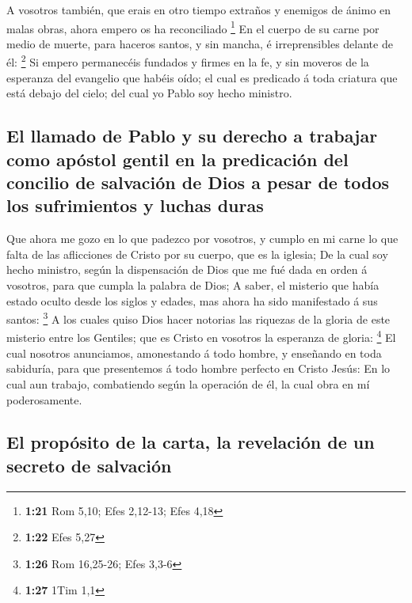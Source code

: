  A vosotros también, que erais en otro tiempo extraños y
enemigos de ánimo en malas obras, ahora empero os ha reconciliado
\footnote{\textbf{1:21} Rom 5,10; Efes 2,12-13; Efes 4,18}
 En el cuerpo de su carne por medio de muerte, para
haceros santos, y sin mancha, é irreprensibles delante de él:
\footnote{\textbf{1:22} Efes 5,27}  Si empero permanecéis
fundados y firmes en la fe, y sin moveros de la esperanza del evangelio
que habéis oído; el cual es predicado á toda criatura que está debajo
del cielo; del cual yo Pablo soy hecho ministro.

\hypertarget{el-llamado-de-pablo-y-su-derecho-a-trabajar-como-apuxf3stol-gentil-en-la-predicaciuxf3n-del-concilio-de-salvaciuxf3n-de-dios-a-pesar-de-todos-los-sufrimientos-y-luchas-duras}{%
\subsection{El llamado de Pablo y su derecho a trabajar como apóstol
gentil en la predicación del concilio de salvación de Dios a pesar de
todos los sufrimientos y luchas
duras}\label{el-llamado-de-pablo-y-su-derecho-a-trabajar-como-apuxf3stol-gentil-en-la-predicaciuxf3n-del-concilio-de-salvaciuxf3n-de-dios-a-pesar-de-todos-los-sufrimientos-y-luchas-duras}}

 Que ahora me gozo en lo que padezco por vosotros, y
cumplo en mi carne lo que falta de las aflicciones de Cristo por su
cuerpo, que es la iglesia;  De la cual soy hecho
ministro, según la dispensación de Dios que me fué dada en orden á
vosotros, para que cumpla la palabra de Dios;  A saber,
el misterio que había estado oculto desde los siglos y edades, mas ahora
ha sido manifestado á sus santos: \footnote{\textbf{1:26} Rom 16,25-26;
  Efes 3,3-6}  A los cuales quiso Dios hacer notorias las
riquezas de la gloria de este misterio entre los Gentiles; que es Cristo
en vosotros la esperanza de gloria: \footnote{\textbf{1:27} 1Tim 1,1}
 El cual nosotros anunciamos, amonestando á todo hombre,
y enseñando en toda sabiduría, para que presentemos á todo hombre
perfecto en Cristo Jesús:  En lo cual aun trabajo,
combatiendo según la operación de él, la cual obra en mí poderosamente.

\hypertarget{el-propuxf3sito-de-la-carta-la-revelaciuxf3n-de-un-secreto-de-salvaciuxf3n}{%
\subsection{El propósito de la carta, la revelación de un secreto de
salvación}\label{el-propuxf3sito-de-la-carta-la-revelaciuxf3n-de-un-secreto-de-salvaciuxf3n}}

